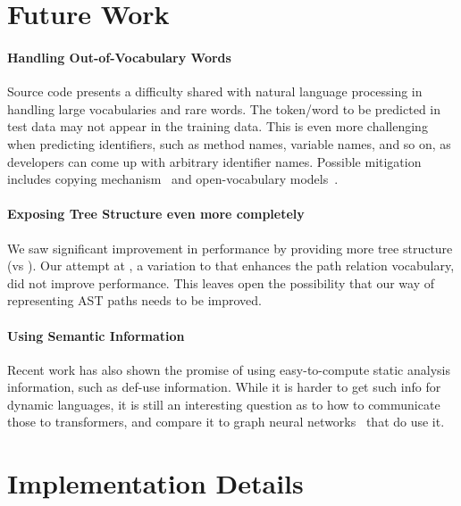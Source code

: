 \documentclass[nonacm, sigconf]{acmart}
\begin{document}
 
\section{Future Work}
\label{sec:future-work}

\paragraph{Handling Out-of-Vocabulary Words}
Source code presents a difficulty shared with natural language processing in handling large vocabularies and rare words. The token/word to be predicted in test data may not appear in the training data. This is even more challenging when predicting identifiers, such as method names, variable names, and so on, as developers can come up with arbitrary identifier names. Possible mitigation includes copying mechanism~\cite{allamanis2016convolutional,brockschmidt2018generative-graph,fernandes2018structured} and open-vocabulary models~\cite{cvitkovic2019open,karampatsis2020big-bpe}.

\paragraph{Exposing Tree Structure even more completely}
We saw significant improvement in performance by providing more tree structure (\DFS vs \TreeRel). Our attempt at \TreeReli, a variation to \TreeRel that enhances the path relation vocabulary, did not improve performance.  This leaves open the possibility that our way of representing AST paths needs to be improved.



\paragraph{Using Semantic Information} Recent work has also shown the promise of using easy-to-compute static analysis information, such as def-use information.  While it is harder to get such info for dynamic languages, it is still an interesting question as to how to communicate those to transformers, and compare it to graph neural networks~\citep{li2016gated,allamanis2018learning-graph} that do use it.
 






\appendix
\newpage
\section{Implementation Details}
\label{sec:implementation-details}
\end{document}
